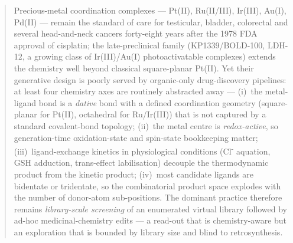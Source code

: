 
\begin{abstract}
\noindent Precious-metal coordination complexes --- Pt(II), Ru(II/III),
Ir(III), Au(I), Pd(II) --- remain the standard of care for testicular,
bladder, colorectal and several head-and-neck cancers forty-eight years
after the 1978 FDA approval of cisplatin; the late-preclinical family
(KP1339/BOLD-100, LDH-12, a growing class of Ir(III)/Au(I)
photoactivatable complexes) extends the chemistry well beyond classical
square-planar Pt(II).  Yet their generative design is poorly served by
organic-only drug-discovery pipelines: at least four chemistry axes are
routinely abstracted away --- (i)~the metal-ligand bond is a
\emph{dative} bond with a defined coordination geometry (square-planar
for Pt(II), octahedral for Ru/Ir(III)) that is not captured by a
standard covalent-bond topology; (ii)~the metal centre is
\emph{redox-active}, so generation-time oxidation-state and spin-state
bookkeeping matter; (iii)~ligand-exchange kinetics in physiological
conditions (Cl\textsuperscript{-} aquation, GSH adduction,
trans-effect labilisation) decouple the thermodynamic product from the
kinetic product; (iv)~most candidate ligands are bidentate or
tridentate, so the combinatorial product space explodes with the number
of donor-atom sub-positions.  The dominant practice therefore remains
\emph{library-scale screening} of an enumerated virtual library
followed by ad-hoc medicinal-chemistry edits --- a read-out that is
chemistry-aware but an exploration that is bounded by library size
and blind to retrosynthesis.


\end{abstract}
